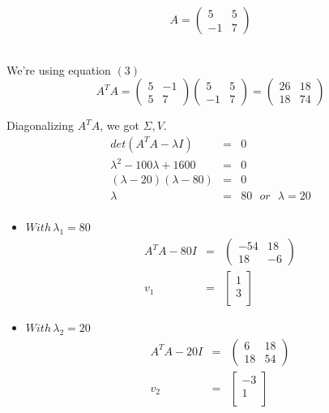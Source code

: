 \documentclass[a4paper, 12pt]{report}
\begin{document}
$$A = \begin{pmatrix} 5 & 5 \\ -1 & 7 \end{pmatrix} $$\\
\indent \par We're using equation $(3)$
$$ A^TA = \begin{pmatrix} 5 & -1 \\ 5 & 7 \end{pmatrix} \begin{pmatrix} 5 & 5 \\ -1 & 7 \end{pmatrix} = \begin{pmatrix} 26 & 18 \\ 18 & 74 \end{pmatrix} $$
\indent \par Diagonalizing $A^TA$, we got $\Sigma, V$.
\begin{eqnarray*}
  det(A^TA - \lambda I ) &=& 0\\
  \lambda^2 - 100\lambda + 1600 &=&  0\\
  (\lambda - 20 )(\lambda-80) &=&   0\\
  \lambda &=& 80 ~~~ or ~~~ \lambda = 20\\
\end{eqnarray*}
\begin{itemize}
    \item $With \, \lambda_1 = 80 $
        \begin{eqnarray*}
          A^TA - 80I &=& \begin{pmatrix} -54 & 18 \\ 18 & -6 \end{pmatrix}\\
          v_1&=&  \begin{bmatrix}
            1 \\
            3 \\
          \end{bmatrix} 
        \end{eqnarray*}
    \item $With \, \lambda_2 = 20 $
        \begin{eqnarray*}
         A^TA - 20I &=& \begin{pmatrix} 6 & 18 \\ 18 & 54 \end{pmatrix}\\
          v_2&=&\begin{bmatrix}
            -3 \\
            1 \\
          \end{bmatrix}
        \end{eqnarray*}
\end{itemize}
\end{document}
